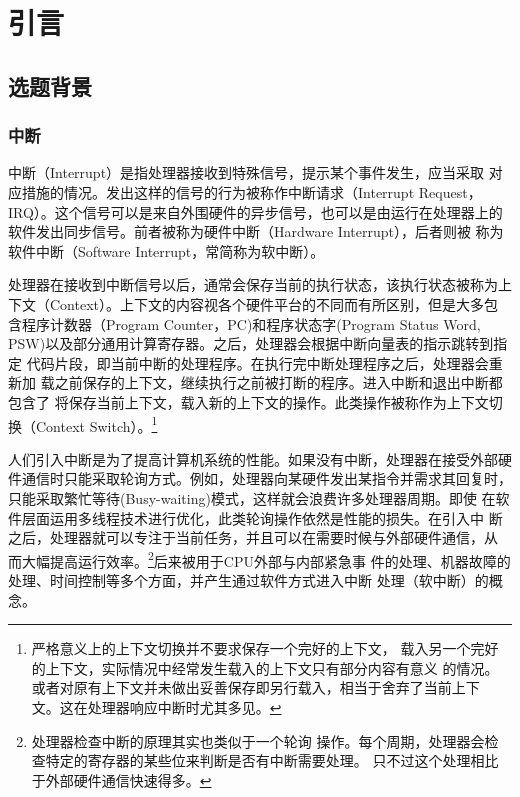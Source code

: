 
\chapter{引言}
\label{cha:intro}

\section{选题背景}
\label{sec:background}

\subsection{中断}
\label{subsec:intr}
中断（Interrupt）是指处理器接收到特殊信号，提示某个事件发生，应当采取
对应措施的情况。发出这样的信号的行为被称作中断请求（Interrupt Request，
IRQ）。这个信号可以是来自外围硬件的异步信号，也可以是由运行在处理器上的
软件发出同步信号。前者被称为硬件中断（Hardware Interrupt），后者则被
称为软件中断（Software Interrupt，常简称为软中断）。

处理器在接收到中断信号以后，通常会保存当前的执行状态，该执行状态被称为上
下文（Context）。上下文的内容视各个硬件平台的不同而有所区别，但是大多包
含程序计数器（Program Counter，PC)和程序状态字(Program Status Word, 
PSW)以及部分通用计算寄存器。之后，处理器会根据中断向量表的指示跳转到指定
代码片段，即当前中断的处理程序。在执行完中断处理程序之后，处理器会重新加
载之前保存的上下文，继续执行之前被打断的程序。进入中断和退出中断都包含了
将保存当前上下文，载入新的上下文的操作。此类操作被称作为上下文切换（Context 
Switch）。\footnote{严格意义上的上下文切换并不要求保存一个完好的上下文，
载入另一个完好的上下文，实际情况中经常发生载入的上下文只有部分内容有意义
的情况。或者对原有上下文并未做出妥善保存即另行载入，相当于舍弃了当前上下
文。这在处理器响应中断时尤其多见。}

人们引入中断是为了提高计算机系统的性能。如果没有中断，处理器在接受外部硬
件通信时只能采取轮询方式。例如，处理器向某硬件发出某指令并需求其回复时，
只能采取繁忙等待(Busy-waiting)模式，这样就会浪费许多处理器周期。即使
在软件层面运用多线程技术进行优化，此类轮询操作依然是性能的损失。在引入中
断之后，处理器就可以专注于当前任务，并且可以在需要时候与外部硬件通信，从
而大幅提高运行效率。\footnote{处理器检查中断的原理其实也类似于一个轮询
操作。每个周期，处理器会检查特定的寄存器的某些位来判断是否有中断需要处理。
只不过这个处理相比于外部硬件通信快速得多。}后来被用于CPU外部与内部紧急事
件的处理、机器故障的处理、时间控制等多个方面，并产生通过软件方式进入中断
处理（软中断）的概念。

